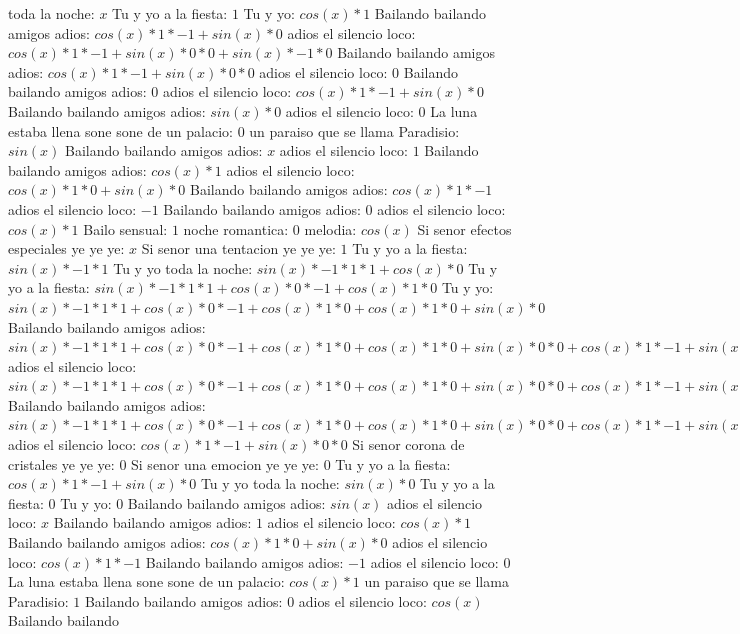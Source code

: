 \documentclass{article}
\begin{document}
toda la noche: $x$ Tu y yo a la fiesta: $1$  \newline Tu y yo: $cos(x)*1$ Bailando bailando amigos adios: $cos(x)*1*-1+sin(x)*0$ adios el silencio loco: ${cos(x)*1*-1+sin(x)*0}*0+sin(x)*-1*0$ Bailando bailando amigos adios: ${cos(x)*1*-1+sin(x)*0}*0$ adios el silencio loco: $0$ Bailando bailando amigos adios: $0$  \newline adios el silencio loco: $cos(x)*1*-1+sin(x)*0$  \newline Bailando bailando amigos adios: $sin(x)*0$ adios el silencio loco: $0$ La luna estaba llena sone sone de un palacio: $0$  \newline un paraiso que se llama Paradisio: $sin(x)$  \newline Bailando bailando amigos adios: $x$ adios el silencio loco: $1$  \newline Bailando bailando amigos adios: $cos(x)*1$ adios el silencio loco: $cos(x)*1*0+sin(x)*0$ Bailando bailando amigos adios: $cos(x)*1*-1$ adios el silencio loco: $-1$ Bailando bailando amigos adios: $0$  \newline adios el silencio loco: $cos(x)*1$ Bailo sensual: $1$ noche romantica: $0$  \newline melodia: $cos(x)$  \newline Si senor efectos especiales ye ye ye: $x$ Si senor una tentacion ye ye ye: $1$  \newline Tu y yo a la fiesta: $sin(x)*-1*1$ Tu y yo toda la noche: $sin(x)*-1*1*1+cos(x)*0$ Tu y yo a la fiesta: ${sin(x)*-1*1*1+cos(x)*0}*-1+cos(x)*1*0$ Tu y yo: ${sin(x)*-1*1*1+cos(x)*0}*-1+cos(x)*1*0+cos(x)*1*0+sin(x)*0$ Bailando bailando amigos adios: ${{sin(x)*-1*1*1+cos(x)*0}*-1+cos(x)*1*0+cos(x)*1*0+sin(x)*0}*0+{cos(x)*1*-1+sin(x)*0}*0$ adios el silencio loco: ${{sin(x)*-1*1*1+cos(x)*0}*-1+cos(x)*1*0+cos(x)*1*0+sin(x)*0}*0+{cos(x)*1*-1+sin(x)*0}*0+{cos(x)*1*-1+sin(x)*0}*0+sin(x)*-1*0$ Bailando bailando amigos adios: ${{sin(x)*-1*1*1+cos(x)*0}*-1+cos(x)*1*0+cos(x)*1*0+sin(x)*0}*0+{cos(x)*1*-1+sin(x)*0}*0$  \newline adios el silencio loco: ${cos(x)*1*-1+sin(x)*0}*0$ Si senor corona de cristales ye ye ye: $0$ Si senor una emocion ye ye ye: $0$  \newline Tu y yo a la fiesta: $cos(x)*1*-1+sin(x)*0$  \newline Tu y yo toda la noche: $sin(x)*0$ Tu y yo a la fiesta: $0$ Tu y yo: $0$  \newline Bailando bailando amigos adios: $sin(x)$  \newline adios el silencio loco: $x$ Bailando bailando amigos adios: $1$  \newline adios el silencio loco: $cos(x)*1$ Bailando bailando amigos adios: $cos(x)*1*0+sin(x)*0$ adios el silencio loco: $cos(x)*1*-1$ Bailando bailando amigos adios: $-1$ adios el silencio loco: $0$  \newline La luna estaba llena sone sone de un palacio: $cos(x)*1$ un paraiso que se llama Paradisio: $1$ Bailando bailando amigos adios: $0$  \newline adios el silencio loco: $cos(x)$  \newline Bailando bailando 
\end{document}
